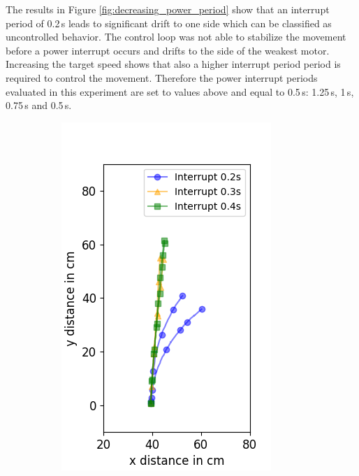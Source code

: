 The results in Figure \ref{fig:decreasing_power_period} show that an interrupt period of 0.2\,s leads to significant drift to one side which can be classified as uncontrolled behavior.
The control loop was not able to stabilize the movement before a power interrupt occurs and drifts to the side of the weakest motor.
Increasing the target speed shows that also a higher interrupt period period is required to control the movement. 
Therefore the power interrupt periods evaluated in this experiment are set to values above and equal to 0.5\,s: 1.25\,s, 1\,s, 0.75\,s and 0.5\,s.


\begin{figure}
	\begin{subfigure}[b]{0.32\textwidth}
		\includegraphics[width=\textwidth]{pics/figure_40.png}

\end{subfigure}
\end{figure}
